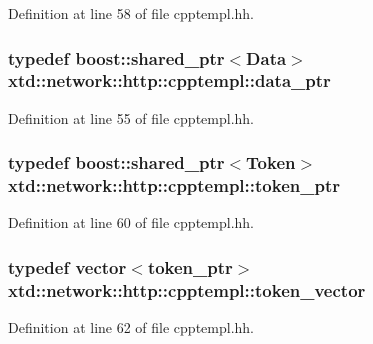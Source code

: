 Definition at line 58 of file cpptempl.\-hh.

\hypertarget{namespacextd_1_1network_1_1http_1_1cpptempl_ad2f49991f1902699a98cf62bf0ae7ce6}{
\subsubsection[{data\-\_\-ptr}]{\setlength{\rightskip}{0pt plus 5cm}typedef boost\-::shared\-\_\-ptr$<${\bf Data}$>$ {\bf xtd\-::network\-::http\-::cpptempl\-::data\-\_\-ptr}}}\label{namespacextd_1_1network_1_1http_1_1cpptempl_ad2f49991f1902699a98cf62bf0ae7ce6}


Definition at line 55 of file cpptempl.\-hh.

\hypertarget{namespacextd_1_1network_1_1http_1_1cpptempl_a09d1bd238d03342e60f0c20c679c0c88}{
\subsubsection[{token\-\_\-ptr}]{\setlength{\rightskip}{0pt plus 5cm}typedef boost\-::shared\-\_\-ptr$<${\bf Token}$>$ {\bf xtd\-::network\-::http\-::cpptempl\-::token\-\_\-ptr}}}\label{namespacextd_1_1network_1_1http_1_1cpptempl_a09d1bd238d03342e60f0c20c679c0c88}


Definition at line 60 of file cpptempl.\-hh.

\hypertarget{namespacextd_1_1network_1_1http_1_1cpptempl_a38606cfbbfe81ed46ea9b0cf064de956}{
\subsubsection[{token\-\_\-vector}]{\setlength{\rightskip}{0pt plus 5cm}typedef vector$<${\bf token\-\_\-ptr}$>$ {\bf xtd\-::network\-::http\-::cpptempl\-::token\-\_\-vector}}}\label{namespacextd_1_1network_1_1http_1_1cpptempl_a38606cfbbfe81ed46ea9b0cf064de956}


Definition at line 62 of file cpptempl.\-hh.



